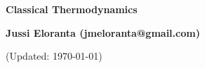 \documentclass[serif]{beamer}
\begin{document}
\phantom{hauki}
\vfill
\begin{center}
\textbf{Classical Thermodynamics}\\

\vspace{1cm}

\textbf{Jussi Eloranta (jmeloranta@gmail.com)}\\

\vspace{1cm}

{\tiny (Updated: \today)}

\end{center}
\vfill
\newpage












%
\end{document}
